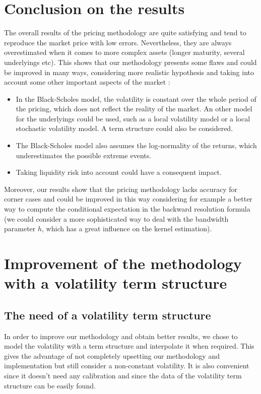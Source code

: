 \documentclass[a4paper,11pt,english]{book}
\begin{document}
\section{Conclusion on the results}
The overall results of the pricing methodology are quite satisfying and tend to reproduce the market price with low errors. Nevertheless, they are always overestimated when it comes to more complex assets (longer maturity, several underlyings etc). This shows that our methodology presents some flaws and could be improved in many ways, considering more realistic hypothesis and taking into account some other important aspects of the market :
\begin{itemize}
    \item In the Black-Scholes model, the volatility is constant over the whole period of the pricing, which does not reflect the reality of the market. An other model for the underlyings could be used, such as a local volatility model or a local stochastic volatility model. A term structure could also be considered.
    \item The Black-Scholes model also assumes the log-normality of the returns, which underestimates the possible extreme events.
    \item Taking liquidity risk into account could have a consequent impact.
\end{itemize}

Moreover, our results show that the pricing methodology lacks accuracy for corner cases and could be improved in this way considering for example a better way to compute the conditional expectation in the backward resolution formula (we could consider a more sophisticated way to deal with the bandwidth parameter $h$, which has a great influence on the kernel estimation).

\section{Improvement of the methodology with a volatility term structure}
\subsection{The need of a volatility term structure}
In order to improve our methodology and obtain better results, we chose to model the volatility with a term structure and interpolate it when required. This gives the advantage of not completely upsetting our methodology and implementation but still consider a non-constant volatility. It is also convenient since it doesn't need any calibration and since the data of the volatility term structure can be easily found.
\end{document}
